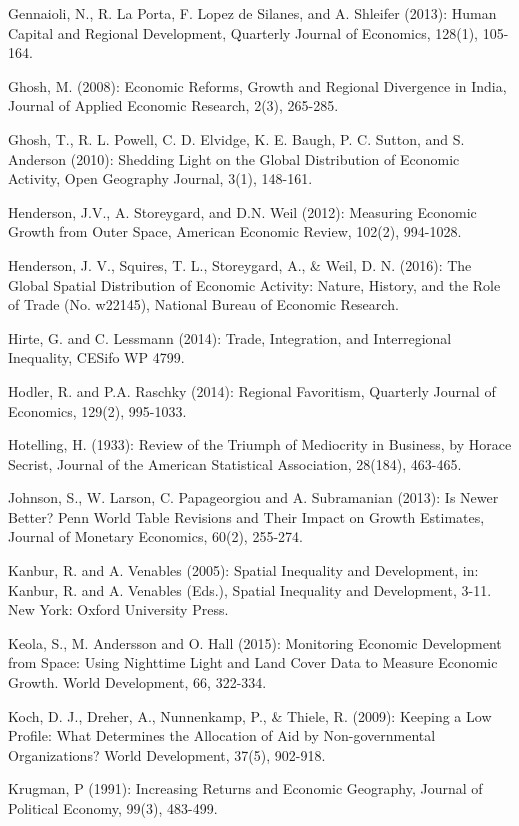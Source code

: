 \documentclass[10pt]{article}
\begin{document}
Gennaioli, N., R. La Porta, F. Lopez de Silanes, and A. Shleifer (2013): Human Capital and Regional Development, Quarterly Journal of Economics, 128(1), 105-164.

Ghosh, M. (2008): Economic Reforms, Growth and Regional Divergence in India, Journal of Applied Economic Research, 2(3), 265-285.

Ghosh, T., R. L. Powell, C. D. Elvidge, K. E. Baugh, P. C. Sutton, and S. Anderson (2010): Shedding Light on the Global Distribution of Economic Activity, Open Geography Journal, 3(1), 148-161.

Henderson, J.V., A. Storeygard, and D.N. Weil (2012): Measuring Economic Growth from Outer Space, American Economic Review, 102(2), 994-1028.

Henderson, J. V., Squires, T. L., Storeygard, A., \& Weil, D. N. (2016): The Global Spatial Distribution of Economic Activity: Nature, History, and the Role of Trade (No. w22145), National Bureau of Economic Research.

Hirte, G. and C. Lessmann (2014): Trade, Integration, and Interregional Inequality, CESifo WP 4799.

Hodler, R. and P.A. Raschky (2014): Regional Favoritism, Quarterly Journal of Economics, 129(2), 995-1033.

Hotelling, H. (1933): Review of the Triumph of Mediocrity in Business, by Horace Secrist, Journal of the American Statistical Association, 28(184), 463-465.

Johnson, S., W. Larson, C. Papageorgiou and A. Subramanian (2013): Is Newer Better? Penn World Table Revisions and Their Impact on Growth Estimates, Journal of Monetary Economics, 60(2), 255-274.

Kanbur, R. and A. Venables (2005): Spatial Inequality and Development, in: Kanbur, R. and A. Venables (Eds.), Spatial Inequality and Development, 3-11. New York: Oxford University Press.

Keola, S., M. Andersson and O. Hall (2015): Monitoring Economic Development from Space: Using Nighttime Light and Land Cover Data to Measure Economic Growth. World Development, 66, 322-334.

Koch, D. J., Dreher, A., Nunnenkamp, P., \& Thiele, R. (2009): Keeping a Low Profile: What Determines the Allocation of Aid by Non-governmental Organizations? World Development, 37(5), 902-918.

Krugman, P (1991): Increasing Returns and Economic Geography, Journal of Political Economy, 99(3), 483-499.
\end{document}
